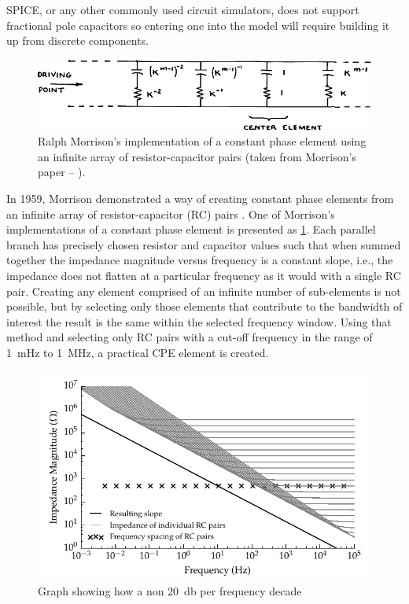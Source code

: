     SPICE, or any other commonly used circuit simulators, does not support fractional pole capacitors so entering one into the model will require building it up from discrete components.
    \begin{figure}[h]
      \centering
      \includegraphics{content/pt2/07-InterfaceModel/graphics/Morrison-RC}
      \caption{\label{graph:pt2-morrisonCPE}Ralph Morrison's implementation of a constant phase element using an infinite array of resistor-capacitor pairs (taken from Morrison's paper -- \cite{Morrison1959}).}
    \end{figure}
    In 1959, Morrison demonstrated a way of creating constant phase elements from an infinite array of resistor-capacitor (RC) pairs \cite{Morrison1959}.
    One of Morrison's implementations of a constant phase element is presented as \cref{graph:pt2-morrisonCPE}.
    Each parallel branch has precisely chosen resistor and capacitor values such that when summed together the impedance magnitude versus frequency is a constant slope, i.e., the impedance does not flatten at a particular frequency as it would with a single RC pair.
    Creating any element comprised of an infinite number of sub-elements is not possible, but by selecting only those elements that contribute to the bandwidth of interest the result is the same within the selected frequency window.
    Using that method and selecting only RC pairs with a cut-off frequency in the range of \SI{1}{\milli\hertz} to \SI{1}{\mega\hertz}, a practical CPE element is created.

    \begin{figure}
      \centering
      \includegraphics{content/pt2/07-InterfaceModel/graphics/graph_cpe_creation}
      \caption{\label{graph:pt2-cpe_creation}Graph showing how a non \SI{20}{\decibel} per frequency decade}
    \end{figure}

